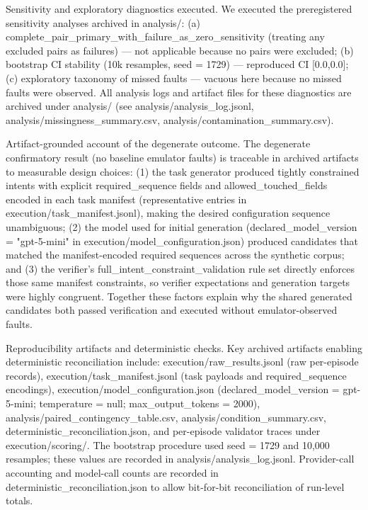 \documentclass[conference]{IEEEtran}
\begin{document}
Sensitivity and exploratory diagnostics executed. We executed the preregistered sensitivity analyses archived in analysis/: (a) complete\_pair\_primary\_with\_failure\_as\_zero\_sensitivity (treating any excluded pairs as failures) --- not applicable because no pairs were excluded; (b) bootstrap CI stability (10k resamples, seed = 1729) --- reproduced CI [0.0,0.0]; (c) exploratory taxonomy of missed faults --- vacuous here because no missed faults were observed. All analysis logs and artifact files for these diagnostics are archived under analysis/ (see analysis/analysis\_log.jsonl, analysis/missingness\_summary.csv, analysis/contamination\_summary.csv).

Artifact-grounded account of the degenerate outcome. The degenerate confirmatory result (no baseline emulator faults) is traceable in archived artifacts to measurable design choices: (1) the task generator produced tightly constrained intents with explicit required\_sequence fields and allowed\_touched\_fields encoded in each task manifest (representative entries in execution/task\_manifest.jsonl), making the desired configuration sequence unambiguous; (2) the model used for initial generation (declared\_model\_version = "gpt-5-mini" in execution/model\_configuration.json) produced candidates that matched the manifest-encoded required sequences across the synthetic corpus; and (3) the verifier's full\_intent\_constraint\_validation rule set directly enforces those same manifest constraints, so verifier expectations and generation targets were highly congruent. Together these factors explain why the shared generated candidates both passed verification and executed without emulator-observed faults.

Reproducibility artifacts and deterministic checks. Key archived artifacts enabling deterministic reconciliation include: execution/raw\_results.jsonl (raw per-episode records), execution/task\_manifest.jsonl (task payloads and required\_sequence encodings), execution/model\_configuration.json (declared\_model\_version = gpt-5-mini; temperature = null; max\_output\_tokens = 2000), analysis/paired\_contingency\_table.csv, analysis/condition\_summary.csv, deterministic\_reconciliation.json, and per-episode validator traces under execution/scoring/. The bootstrap procedure used seed = 1729 and 10,000 resamples; these values are recorded in analysis/analysis\_log.jsonl. Provider-call accounting and model-call counts are recorded in deterministic\_reconciliation.json to allow bit-for-bit reconciliation of run-level totals.
\end{document}
